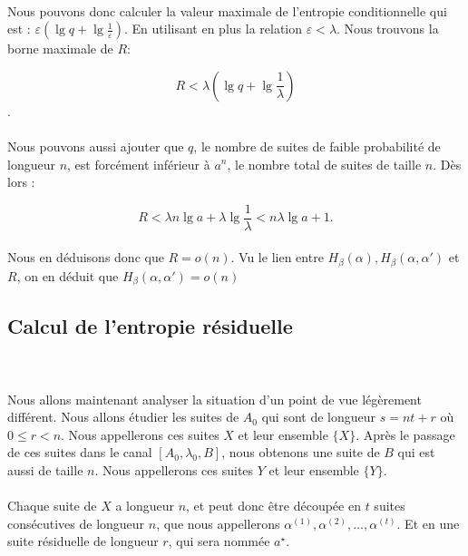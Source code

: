 	\paragraph{}
	Nous pouvons donc calculer la valeur maximale de l'entropie conditionnelle
	qui est : $\varepsilon \left(\lg q+\lg\frac{1}{\varepsilon}\right)$.
	En utilisant en plus la relation $\varepsilon < \lambda$. Nous trouvons la
	borne maximale de $R$:
	
	\[R<\lambda\left(\lg q+\lg\frac{1}{\lambda}\right)\].
	
	\paragraph{}
	Nous pouvons aussi ajouter que $q$, le nombre de suites de faible 
	probabilité de longueur $n$, est forcément inférieur à $a^n$, le 
	nombre total de suites de taille $n$.
	Dès lors :
	
	\[R<\lambda n\lg a +\lambda \lg \frac{1}{\lambda}<n\lambda\lg a+1.\]
	
	\paragraph{}
	Nous en déduisons donc que $R=o(n)$. Vu le lien entre 
	$H_\beta(\alpha),H_\beta(\alpha,\alpha')$ et $R$, 
	on en déduit que $H_\beta(\alpha,\alpha')=o(n)$
	
\subsection*{Calcul de l'entropie résiduelle}\
	
	\paragraph{}
	Nous allons maintenant analyser la situation d'un point de vue 
	légèrement différent. Nous allons étudier les suites de $A_0$ qui sont
	de longueur $s = nt+r$ où $0\le r < n$. Nous appellerons ces suites 
	$X$ et leur ensemble $\{X\}$. Après le passage de ces suites dans le 
	canal $[A_0,\lambda_0,B]$, nous obtenons une suite de $B$ qui est aussi
	de taille $n$. Nous appellerons ces suites $Y$ et 
	leur ensemble $\{Y\}$.
	
	\paragraph{}
	Chaque suite de $X$ a longueur $n$, et peut donc être découpée en 
	$t$ suites consécutives de longueur $n$, que nous appellerons 
	$\alpha^{(1)}, \alpha^{(2)}, \dots, \alpha^{(t)}$.
	Et en une suite résiduelle de longueur $r$, qui sera nommée $a^\star$.
	
